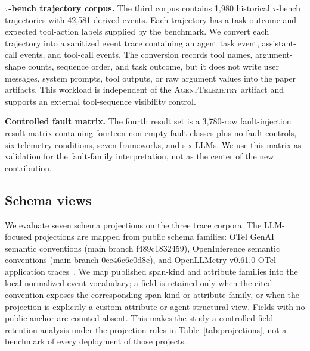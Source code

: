 \documentclass[conference]{IEEEtran}
\begin{document}
\textbf{$\tau$-bench trajectory corpus.} The third corpus contains 1,980
historical $\tau$-bench trajectories with 42,581 derived events. Each
trajectory has a task outcome and expected tool-action labels supplied
by the benchmark. We convert each trajectory into a sanitized event
trace containing an agent task event, assistant-call events, and
tool-call events. The conversion records tool names, argument-shape
counts, sequence order, and task outcome, but it does not write user
messages, system prompts, tool outputs, or raw argument values into the
paper artifacts. This workload is independent of the
\textsc{AgentTelemetry} artifact and supports an external tool-sequence
visibility control.

\textbf{Controlled fault matrix.} The fourth result set is a 3,780-row
fault-injection result matrix containing fourteen non-empty fault
classes plus no-fault controls, six telemetry conditions, seven
frameworks, and six LLMs. We use this matrix as validation for the
fault-family interpretation, not as the center of the new contribution.

\subsection{Schema views}

We evaluate seven schema projections on the three trace corpora. The
LLM-focused projections are mapped from public schema families: OTel
GenAI semantic conventions (main branch f489c1832459), OpenInference
semantic conventions (main branch 0ee46c6c0d8e), and OpenLLMetry
v0.61.0 OTel application traces~\cite{otel_genai,openllmetry,openinference}.
We map published span-kind and attribute families into the local
normalized event vocabulary; a field is retained only when the cited
convention exposes the corresponding span kind or attribute family, or
when the projection is explicitly a custom-attribute or agent-structural
view. Fields with no public anchor are counted absent. This makes the
study a controlled field-retention analysis under the projection rules
in Table~\ref{tab:projections}, not a benchmark of every deployment of
those projects.
\end{document}
